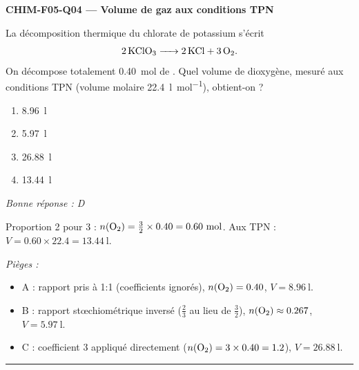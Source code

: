 \documentclass[11pt,a4paper]{article}
\begin{document}
\noindent\textbf{CHIM-F05-Q04 --- Volume de gaz aux conditions TPN}\par
La décomposition thermique du chlorate de potassium s'écrit
\[\ce{2 KClO3 -> 2 KCl + 3 O2}.\]
On décompose totalement \qty{0.40}{\mole} de . Quel volume de dioxygène, mesuré aux conditions TPN (volume molaire \qty{22.4}{\litre\per\mole}), obtient-on ?
\begin{enumerate}[label=\Alph*)]
\item \qty{8.96}{\litre}
\item \qty{5.97}{\litre}
\item \qty{26.88}{\litre}
\item \qty{13.44}{\litre}
\end{enumerate}
\textit{Bonne réponse : D}\par
Proportion \num{2}  pour \num{3}  : $n(\ce{O2})=\tfrac{3}{2}\times\num{0.40}=\num{0.60}~\si{\mole}$. Aux TPN : $V=\num{0.60}\times\num{22.4}=\qty{13.44}{\litre}$.\par
\textit{Pièges :}
\begin{itemize}
\item A : rapport pris à \num{1}:\num{1} (coefficients ignorés), $n(\ce{O2})=\num{0.40}$, $V=\qty{8.96}{\litre}$.
\item B : rapport stœchiométrique inversé ($\tfrac{2}{3}$ au lieu de $\tfrac{3}{2}$), $n(\ce{O2})\approx\num{0.267}$, $V=\qty{5.97}{\litre}$.
\item C : coefficient \num{3} appliqué directement ($n(\ce{O2})=\num{3}\times\num{0.40}=\num{1.2}$), $V=\qty{26.88}{\litre}$.
\end{itemize}
\vspace{6pt}\hrule\vspace{8pt}
\end{document}
